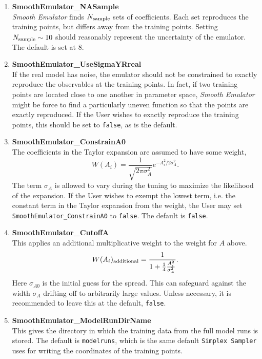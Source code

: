 \documentclass[UserManual.tex]{subfiles}
\begin{document}
\begin{enumerate}
\item {\bf SmoothEmulator\_NASample}\\
{\it Smooth Emulator} finds $N_{\rm sample}$ sets of coefficients. Each set reproduces the training points, but differs away from the training points. Setting $N_{\rm sample}\sim 10$ should reasonably represent the uncertainty of the emulator. The default is set at 8.
\item {\bf SmoothEmulator\_UseSigmaYRreal}\\
If the real model has noise, the emulator should not be constrained to exactly reproduce the observables at the training points. In fact, if two training points are located close to one another in parameter space, {\it Smooth Emulator} might be force to find a particularly uneven function so that the points are exactly reproduced. If the User wishes to exactly reproduce the training points, this should be set to {\tt false}, as is the  default. 
\item {\bf SmoothEmulator\_ConstrainA0}\\
The coefficients in the Taylor expansion are assumed to have some weight,
\[
W(A_i)=\frac{1}{\sqrt{2\pi\sigma_A^2}}e^{-A_i^2/2\sigma_A^2}.
\]
The term $\sigma_A$ is allowed to vary during the tuning to maximize the likelihood of the expansion. If the User wishes to exempt the lowest term, i.e. the constant term in the Taylor expansion from the weight, the User may set {\tt SmoothEmulator\_ConstrainA0} to {\tt false}. The default is {\tt false}.
\item {\bf SmoothEmulator\_CutoffA}\\
This applies an additional multiplicative weight to the weight for $A$ above.
\[
W(A_i)_{\rm additional}=\frac{1}{1+\frac{1}{4}\frac{A_i^2}{\sigma_{A}^2}}.
\] 
Here $\sigma_{A0}$ is the initial guess for the spread. This can safeguard against the width $\sigma_A$ drifting off to arbitrarily large values. Unless necessary, it is recommended to leave this at the default, {\tt false}.
\item {\bf SmoothEmulator\_ModelRunDirName}\\
This gives the directory in which the training data from the full model runs is stored. The default is {\tt modelruns}, which is the same default {\tt Simplex Sampler} uses for writing the coordinates of the training points.


\end{enumerate}
\end{document}
